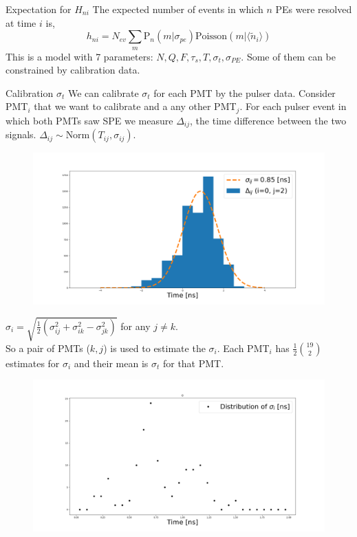 \documentclass{beamer}
\begin{document}
\begin{frame}{Expectation for $H_{ni}$}
The expected number of events in which $n$ PEs were resolved at time $i$ is,
\begin{equation}
h_{ni}=N_{ev}\sum_{m}\text{P}_n(m|\sigma_{pe})\text{Poisson}(m|\langle \tilde{n}_i\rangle)
\end{equation}
This is a model with 7 parameters: $N, Q, F, \tau_s, T, \sigma_t, \sigma_{PE}$. Some of them can be constrained by calibration data.
\end{frame}

\begin{frame}{Calibration $\sigma_t$}
We can calibrate $\sigma_t$ for each PMT by the pulser data. Consider PMT$_i$ that we want to calibrate and a any other PMT$_j$. For each pulser event in which both PMTs saw SPE we measure $\Delta_{ij}$, the time difference between the two signals. $\Delta_{ij}\sim\text{Norm}(T_{ij}, \sigma_{ij})$.
\begin{figure}[h]
\includegraphics[width=1\linewidth]{sigma_ij.png}
\end{figure}
\end{frame}

\begin{frame}
$\sigma_i=\sqrt{\frac{1}{2}(\sigma^2_{ij}+\sigma^2_{ik}-\sigma^2_{jk})}$ for any $j\neq k$.\\
So a pair of PMTs ($k,j$) is used to estimate the $\sigma_i$. Each PMT$_i$ has $\frac{1}{2}{19\choose 2}$ estimates for $\sigma_i$ and their mean is $\sigma_t$ for that PMT.
\begin{figure}[h]
\includegraphics[width=1\linewidth]{sigma_i.png}
\end{figure}
\end{frame}
\end{document}
